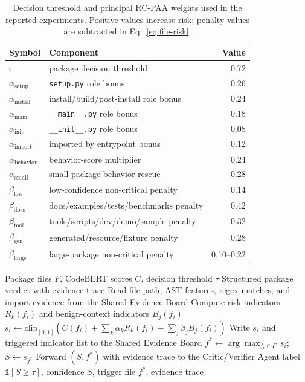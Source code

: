 \documentclass[conference,a4paper]{IEEEtran}
\newcommand{\rcpaa}{RC-PAA}
\newcommand{\codebert}{CodeBERT}
\begin{document}
\begin{table}[t]
\centering
\caption{Decision threshold and principal \rcpaa{} weights used in the reported
experiments. Positive values increase risk; penalty values are subtracted in
Eq.~\ref{eq:file-risk}.}
\label{tab:weights}
\tiny
\setlength{\tabcolsep}{3pt}
\begin{tabular}{llr}
\toprule
Symbol & Component & Value \\
\midrule
$\tau$ & package decision threshold & 0.72 \\
$\alpha_{\mathrm{setup}}$ & \texttt{setup.py} role bonus & 0.26 \\
$\alpha_{\mathrm{install}}$ & install/build/post-install role bonus & 0.24 \\
$\alpha_{\mathrm{main}}$ & \texttt{\_\_main\_\_.py} role bonus & 0.18 \\
$\alpha_{\mathrm{init}}$ & \texttt{\_\_init\_\_.py} role bonus & 0.08 \\
$\alpha_{\mathrm{import}}$ & imported by entrypoint bonus & 0.12 \\
$\alpha_{\mathrm{behavior}}$ & behavior-score multiplier & 0.24 \\
$\alpha_{\mathrm{small}}$ & small-package behavior rescue & 0.28 \\
$\beta_{\mathrm{low}}$ & low-confidence non-critical penalty & 0.14 \\
$\beta_{\mathrm{docs}}$ & docs/examples/tests/benchmarks penalty & 0.42 \\
$\beta_{\mathrm{tool}}$ & tools/scripts/dev/demo/sample penalty & 0.32 \\
$\beta_{\mathrm{gen}}$ & generated/resource/fixture penalty & 0.28 \\
$\beta_{\mathrm{large}}$ & large-package non-critical penalty & 0.10--0.22 \\
\bottomrule
\end{tabular}
\end{table}

\begin{algorithm}[t]
\caption{Evidence-Driven \rcpaa{} Aggregation}
\label{alg:rcpaa}
\begin{algorithmic}[1]
\Require Package files $F$, \codebert{} scores $C$, decision threshold $\tau$
\Ensure Structured package verdict with evidence trace
    \State Read file path, AST features, regex matches, and import evidence from the
           Shared Evidence Board
    \State Compute risk indicators $R_k(f_i)$ and benign-context indicators $B_j(f_i)$
    \State $s_i \gets \mathrm{clip}_{[0,1]}\!\left(C(f_i)
           + \sum_k\alpha_kR_k(f_i) - \sum_j\beta_jB_j(f_i)\right)$
    \State Write $s_i$ and triggered indicator list to the Shared Evidence Board
\EndFor
\State $f^* \gets \arg\max_{f_i \in F}\, s_i$;\quad $S \gets s_{f^*}$
    \State Forward $(S, f^*)$ with evidence trace to the Critic/Verifier Agent
\EndIf
\State \Return label $\mathbb{1}[S \geq \tau]$, confidence $S$, trigger file $f^*$,
       evidence trace
\end{algorithmic}
\end{algorithm}
\end{document}
